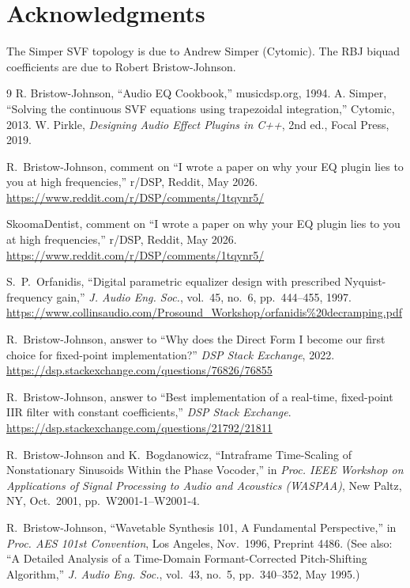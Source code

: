 \documentclass[11pt,a4paper]{article}
\begin{document}
\section*{Acknowledgments}
The Simper SVF topology is due to Andrew Simper (Cytomic). The RBJ biquad coefficients are due to Robert Bristow-Johnson.

\begin{thebibliography}{9}
 R. Bristow-Johnson, ``Audio EQ Cookbook,'' musicdsp.org, 1994.
 A. Simper, ``Solving the continuous SVF equations using trapezoidal integration,'' Cytomic, 2013.
 W. Pirkle, \textit{Designing Audio Effect Plugins in C++}, 2nd ed., Focal Press, 2019.

R.~Bristow-Johnson, comment on ``I wrote a paper on why your EQ plugin lies to you at high frequencies,'' r/DSP, Reddit, May 2026.
\url{https://www.reddit.com/r/DSP/comments/1tqynr5/}

SkoomaDentist, comment on ``I wrote a paper on why your EQ plugin lies to you at high frequencies,'' r/DSP, Reddit, May 2026.
\url{https://www.reddit.com/r/DSP/comments/1tqynr5/}

S.~P.~Orfanidis, ``Digital parametric equalizer design with prescribed Nyquist-frequency gain,''
\textit{J. Audio Eng. Soc.}, vol.~45, no.~6, pp.~444--455, 1997.
\url{https://www.collinsaudio.com/Prosound_Workshop/orfanidis\%20decramping.pdf}

R.~Bristow-Johnson, answer to ``Why does the Direct Form I become our first choice for fixed-point implementation?''
\textit{DSP Stack Exchange}, 2022.
\url{https://dsp.stackexchange.com/questions/76826/76855}

R.~Bristow-Johnson, answer to ``Best implementation of a real-time, fixed-point IIR filter with constant coefficients,''
\textit{DSP Stack Exchange}.
\url{https://dsp.stackexchange.com/questions/21792/21811}

R.~Bristow-Johnson and K.~Bogdanowicz, ``Intraframe Time-Scaling of Nonstationary Sinusoids Within the Phase Vocoder,''
in \textit{Proc. IEEE Workshop on Applications of Signal Processing to Audio and Acoustics (WASPAA)},
New Paltz, NY, Oct.\ 2001, pp.~W2001-1--W2001-4.

R.~Bristow-Johnson, ``Wavetable Synthesis 101, A Fundamental Perspective,''
in \textit{Proc. AES 101st Convention}, Los Angeles, Nov.\ 1996, Preprint 4486.
(See also: ``A Detailed Analysis of a Time-Domain Formant-Corrected
Pitch-Shifting Algorithm,'' \textit{J. Audio Eng. Soc.}, vol.~43, no.~5,
pp.~340--352, May 1995.)


\end{thebibliography}
\end{document}
